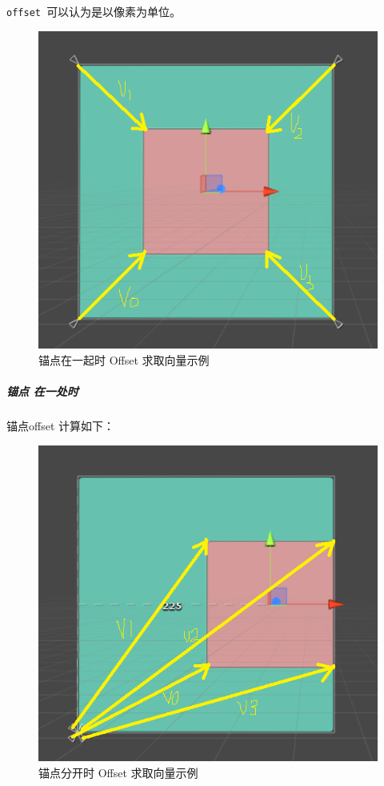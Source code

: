 \documentclass[UTF8,a4paper,12pt]{ctexbook}
\begin{document}
					\verb|offset |可以认为是以像素为单位。
					
					\begin{figure}[H]
						\centering
						\includegraphics[scale=0.7]{Anchors-1.png}
						\caption{锚点在一起时  Offset 求取向量示例}
						\label{锚点分开时 Offset 求取向量示例}
					\end{figure}
			
				\subparagraph{锚点 在一处时}
					锚点offset 计算如下：
					
					\begin{figure}[H]
						\centering
						\includegraphics[scale=0.7]{Anchors-2.png}
						\caption{锚点分开时  Offset 求取向量示例}
					\end{figure}
			
\end{document}
